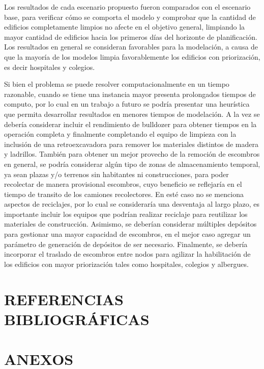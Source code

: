 \documentclass[12pt,a4paper]{article}
\begin{document}
Los resultados de cada escenario propuesto fueron comparados con el escenario base, para verificar cómo se comporta el modelo y comprobar que la cantidad de edificios completamente limpios no afecte en el objetivo general, limpiando la mayor cantidad de edificios hacia los primeros días del horizonte de planificación. Los resultados en general se consideran favorables para la modelación, a causa de que la mayoría de los modelos limpia favorablemente los edificios con priorización, es decir hospitales y colegios.

Si bien el problema se puede resolver computacionalmente en un tiempo razonable, cuando se tiene una instancia mayor presenta prolongados tiempos de computo, por lo cual en un trabajo a futuro se podría presentar una heurística que permita desarrollar resultados en menores tiempos de modelación. A la vez se debería considerar incluir el rendimiento de bulldozer para obtener tiempos en la operación completa y finalmente completando el equipo de limpieza con la inclusión de una retroexcavadora para remover los materiales distintos de madera y ladrillos. También para obtener un mejor provecho de la remoción de escombros en general, se podría considerar algún tipo de zonas de almacenamiento temporal, ya sean plazas y/o terrenos sin habitantes ni construcciones, para poder recolectar de manera provisional escombros, cuyo beneficio se reflejaría en el tiempo de transito de los camiones recolectores. En esté caso no se menciona aspectos de reciclajes, por lo cual se consideraría una desventaja al largo plazo, es importante incluir los equipos que podrían realizar reciclaje para reutilizar los materiales de construcción.  Asimismo, se deberían considerar múltiples depósitos para gestionar una mayor capacidad de escombros, en el mejor caso agregar un parámetro de generación de depósitos de ser necesario. Finalmente, se debería incorporar el traslado de escombros entre nodos para agilizar la habilitación de los edificios con mayor priorización tales como hospitales, colegios y albergues.

\pagebreak

\section{REFERENCIAS BIBLIOGRÁFICAS}




\pagebreak

\section{ANEXOS}
\end{document}
